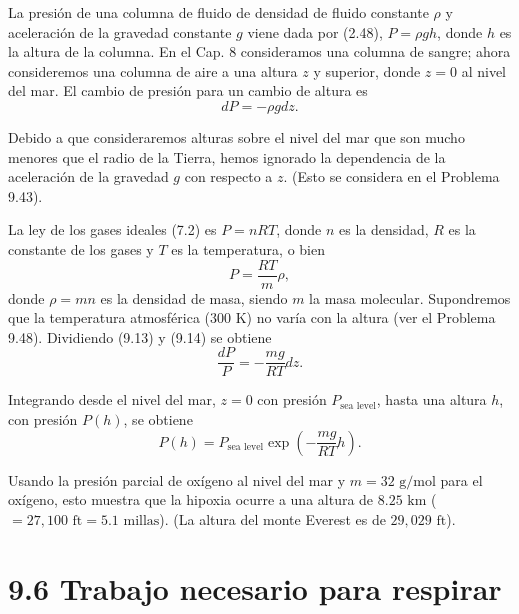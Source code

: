 \documentclass[12pt]{book}
\begin{document}
La presión de una columna de fluido de densidad de fluido constante $\rho$ y aceleración de la gravedad constante $g$ viene dada por (2.48), $P = \rho gh$, donde $h$ es la altura de la columna. En el Cap. 8 consideramos una columna de sangre; ahora consideremos una columna de aire a una altura $z$ y superior, donde $z = 0$ al nivel del mar. El cambio de presión para un cambio de altura es
\begin{equation}
dP = -\rho g dz. \label{eq:9.13}
\end{equation}

Debido a que consideraremos alturas sobre el nivel del mar que son mucho menores que el radio de la Tierra, hemos ignorado la dependencia de la aceleración de la gravedad $g$ con respecto a $z$. (Esto se considera en el Problema 9.43).

La ley de los gases ideales (7.2) es $P = nRT$, donde $n$ es la densidad, $R$ es la constante de los gases y $T$ es la temperatura, o bien
\begin{equation}
P = \frac{RT}{m} \rho, \label{eq:9.14}
\end{equation}
donde $\rho = mn$ es la densidad de masa, siendo $m$ la masa molecular. Supondremos que la temperatura atmosférica ($300\text{ K}$) no varía con la altura (ver el Problema 9.48). Dividiendo (9.13) y (9.14) se obtiene
\begin{equation}
\frac{dP}{P} = -\frac{mg}{RT} dz. \label{eq:9.15}
\end{equation}

Integrando desde el nivel del mar, $z = 0$ con presión $P_{\text{sea level}}$, hasta una altura $h$, con presión $P(h)$, se obtiene
\begin{equation}
P(h) = P_{\text{sea level}} \exp \left( -\frac{mg}{RT} h \right). \label{eq:9.16}
\end{equation}

Usando la presión parcial de oxígeno al nivel del mar y $m = 32\text{ g/mol}$ para el oxígeno, esto muestra que la hipoxia ocurre a una altura de $8.25\text{ km}$ ($= 27{,}100\text{ ft} = 5.1\text{ millas}$). (La altura del monte Everest es de $29{,}029\text{ ft}$).

\FloatBarrier
\section*{9.6 Trabajo necesario para respirar}
\end{document}
